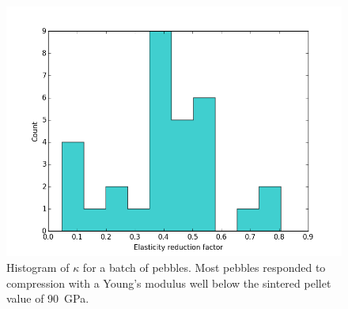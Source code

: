 \begin{figure}[!t]
\centering
    \includegraphics[width=\imagewidth]{chapters/figures/fzk-kappa-histogram.png}
    \caption{Histogram of $\kappa$ for a batch of \lis pebbles. Most pebbles responded to compression with a Young's modulus well below the sintered pellet value of \si{90 GPa}.}
    \label{fig:fzk-kappa-hist}
\end{figure}

